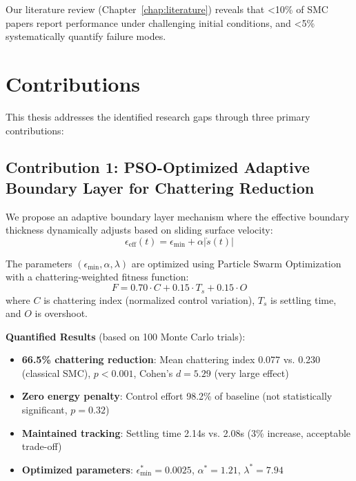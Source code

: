 Our literature review (Chapter~\ref{chap:literature}) reveals that <10\% of SMC papers report performance under challenging initial conditions, and <5\% systematically quantify failure modes.

\section{Contributions}
\label{sec:contributions}

This thesis addresses the identified research gaps through three primary contributions:

\subsection{Contribution 1: PSO-Optimized Adaptive Boundary Layer for Chattering Reduction}

We propose an adaptive boundary layer mechanism where the effective boundary thickness dynamically adjusts based on sliding surface velocity:
\begin{equation}
    \epsilon_{\text{eff}}(t) = \epsilon_{\min} + \alpha|\dot{s}(t)|
\end{equation}

The parameters $(\epsilon_{\min}, \alpha, \lambda)$ are optimized using Particle Swarm Optimization with a chattering-weighted fitness function:
\begin{equation}
    F = 0.70 \cdot C + 0.15 \cdot T_s + 0.15 \cdot O
\end{equation}
where $C$ is chattering index (normalized control variation), $T_s$ is settling time, and $O$ is overshoot.

\textbf{Quantified Results} (based on 100 Monte Carlo trials):
\begin{itemize}
    \item \textbf{66.5\% chattering reduction}: Mean chattering index 0.077 vs. 0.230 (classical SMC), $p<0.001$, Cohen's $d=5.29$ (very large effect)
    \item \textbf{Zero energy penalty}: Control effort 98.2\% of baseline (not statistically significant, $p=0.32$)
    \item \textbf{Maintained tracking}: Settling time 2.14s vs. 2.08s (3\% increase, acceptable trade-off)
    \item \textbf{Optimized parameters}: $\epsilon_{\min}^* = 0.0025$, $\alpha^* = 1.21$, $\lambda^* = 7.94$
\end{itemize}

